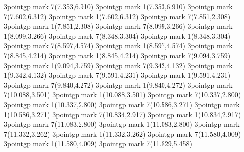 \gp3point{gp mark 7}{}{(7.353,6.910)}
\gp3point{gp mark 1}{}{(7.353,6.910)}
\gp3point{gp mark 7}{}{(7.602,6.312)}
\gp3point{gp mark 1}{}{(7.602,6.312)}
\gp3point{gp mark 7}{}{(7.851,2.308)}
\gp3point{gp mark 1}{}{(7.851,2.308)}
\gp3point{gp mark 7}{}{(8.099,3.266)}
\gp3point{gp mark 1}{}{(8.099,3.266)}
\gp3point{gp mark 7}{}{(8.348,3.304)}
\gp3point{gp mark 1}{}{(8.348,3.304)}
\gp3point{gp mark 7}{}{(8.597,4.574)}
\gp3point{gp mark 1}{}{(8.597,4.574)}
\gp3point{gp mark 7}{}{(8.845,4.214)}
\gp3point{gp mark 1}{}{(8.845,4.214)}
\gp3point{gp mark 7}{}{(9.094,3.759)}
\gp3point{gp mark 1}{}{(9.094,3.759)}
\gp3point{gp mark 7}{}{(9.342,4.132)}
\gp3point{gp mark 1}{}{(9.342,4.132)}
\gp3point{gp mark 7}{}{(9.591,4.231)}
\gp3point{gp mark 1}{}{(9.591,4.231)}
\gp3point{gp mark 7}{}{(9.840,4.272)}
\gp3point{gp mark 1}{}{(9.840,4.272)}
\gp3point{gp mark 7}{}{(10.088,3.501)}
\gp3point{gp mark 1}{}{(10.088,3.501)}
\gp3point{gp mark 7}{}{(10.337,2.800)}
\gp3point{gp mark 1}{}{(10.337,2.800)}
\gp3point{gp mark 7}{}{(10.586,3.271)}
\gp3point{gp mark 1}{}{(10.586,3.271)}
\gp3point{gp mark 7}{}{(10.834,2.917)}
\gp3point{gp mark 1}{}{(10.834,2.917)}
\gp3point{gp mark 7}{}{(11.083,2.800)}
\gp3point{gp mark 1}{}{(11.083,2.800)}
\gp3point{gp mark 7}{}{(11.332,3.262)}
\gp3point{gp mark 1}{}{(11.332,3.262)}
\gp3point{gp mark 7}{}{(11.580,4.009)}
\gp3point{gp mark 1}{}{(11.580,4.009)}
\gp3point{gp mark 7}{}{(11.829,5.458)}
